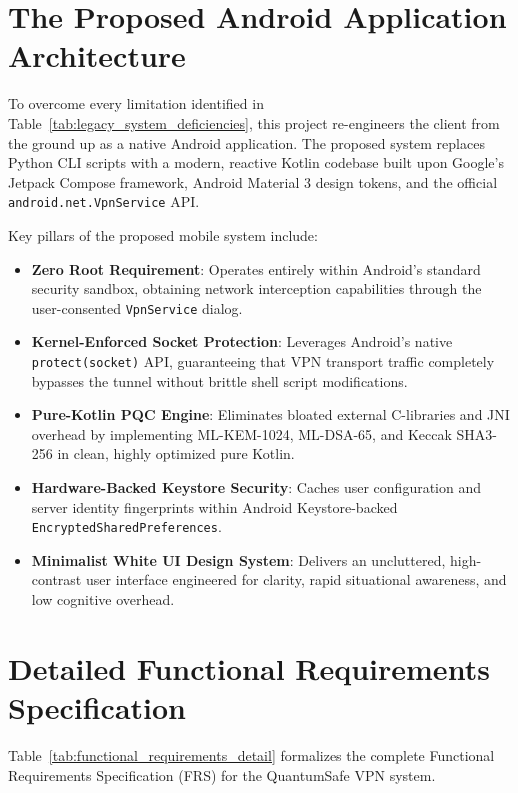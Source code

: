 \section{The Proposed Android Application Architecture}
\label{sec:proposed_android_app}

To overcome every limitation identified in Table~\ref{tab:legacy_system_deficiencies}, this project re-engineers the client from the ground up as a native Android application. The proposed system replaces Python CLI scripts with a modern, reactive Kotlin codebase built upon Google's Jetpack Compose framework, Android Material 3 design tokens, and the official \texttt{android.net.VpnService} API.

Key pillars of the proposed mobile system include:
\begin{itemize}
    \item \textbf{Zero Root Requirement}: Operates entirely within Android's standard security sandbox, obtaining network interception capabilities through the user-consented \texttt{VpnService} dialog.
    \item \textbf{Kernel-Enforced Socket Protection}: Leverages Android's native \texttt{protect(socket)} API, guaranteeing that VPN transport traffic completely bypasses the tunnel without brittle shell script modifications.
    \item \textbf{Pure-Kotlin PQC Engine}: Eliminates bloated external C-libraries and JNI overhead by implementing ML-KEM-1024, ML-DSA-65, and Keccak SHA3-256 in clean, highly optimized pure Kotlin.
    \item \textbf{Hardware-Backed Keystore Security}: Caches user configuration and server identity fingerprints within Android Keystore-backed \texttt{EncryptedSharedPreferences}.
    \item \textbf{Minimalist White UI Design System}: Delivers an uncluttered, high-contrast user interface engineered for clarity, rapid situational awareness, and low cognitive overhead.
\end{itemize}

\section{Detailed Functional Requirements Specification}
\label{sec:detailed_functional_requirements}

Table~\ref{tab:functional_requirements_detail} formalizes the complete Functional Requirements Specification (FRS) for the QuantumSafe VPN system.

